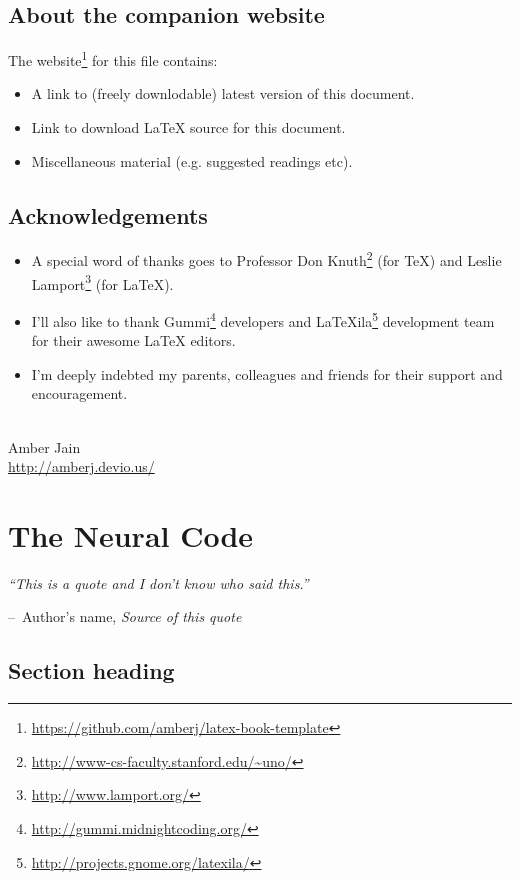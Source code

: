 \documentclass[a4paper,11pt]{book}
\makeatletter
\newenvironment{chapquote}[2][2em]
  {\setlength{\@tempdima}{#1}%
   \def\chapquote@author{#2}%
   \parshape 1 \@tempdima \dimexpr\textwidth-2\@tempdima\relax%
   \itshape}
  {\par\normalfont\hfill--\ \chapquote@author\hspace*{\@tempdima}\par\bigskip}
\makeatother
\begin{document}
\section*{About the companion website}
The website\footnote{\url{https://github.com/amberj/latex-book-template}} for this file contains:
\begin{itemize}
  \item A link to (freely downlodable) latest version of this document.
  \item Link to download LaTeX source for this document.
  \item Miscellaneous material (e.g. suggested readings etc).
\end{itemize}

\section*{Acknowledgements}
\begin{itemize}
\item A special word of thanks goes to Professor Don Knuth\footnote{\url{http://www-cs-faculty.stanford.edu/~uno/}} (for \TeX{}) and Leslie Lamport\footnote{\url{http://www.lamport.org/}} (for \LaTeX{}).
\item I'll also like to thank Gummi\footnote{\url{http://gummi.midnightcoding.org/}} developers and LaTeXila\footnote{\url{http://projects.gnome.org/latexila/}} development team for their awesome \LaTeX{} editors.
\item I'm deeply indebted my parents, colleagues and friends for their support and encouragement.
\end{itemize}
\mbox{}\\
\noindent Amber Jain \\
\noindent \url{http://amberj.devio.us/}

\chapter{The Neural Code}

\begin{chapquote}{Author's name, \textit{Source of this quote}}
``This is a quote and I don't know who said this.''
\end{chapquote}

\section{Section heading}
\end{document}
